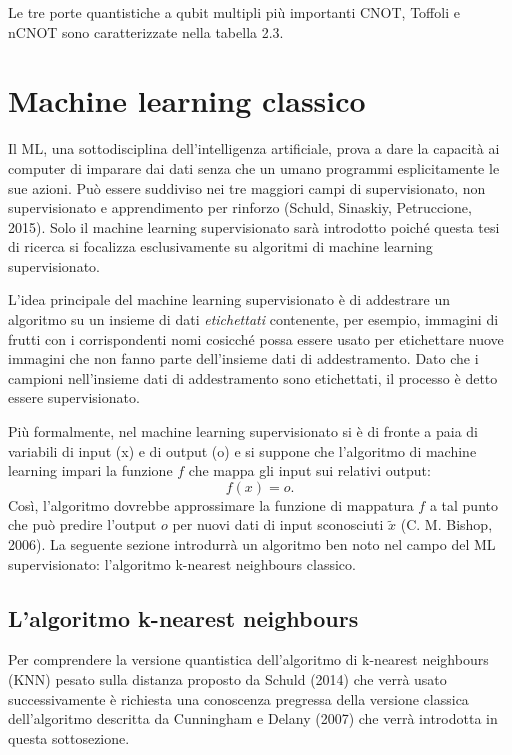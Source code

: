 Le tre porte quantistiche a qubit multipli più importanti CNOT, Toffoli e nCNOT 
sono caratterizzate nella tabella 2.3. 


\section{Machine learning classico}

Il \acf{ML}, una sottodisciplina dell'intelligenza artificiale, prova a dare la 
capacità ai computer di imparare dai dati senza che un umano programmi 
esplicitamente le sue azioni. Può essere suddiviso nei tre maggiori campi di 
supervisionato, non supervisionato e apprendimento per rinforzo (Schuld, 
Sinaskiy, Petruccione, 2015). Solo il machine learning supervisionato sarà 
introdotto poiché questa tesi di ricerca si focalizza esclusivamente su 
algoritmi di machine learning supervisionato. 

L'idea principale del machine learning supervisionato è di addestrare un 
algoritmo su un insieme di dati \emph{etichettati} contenente, per esempio, 
immagini di frutti con i corrispondenti nomi cosicché possa essere usato per 
etichettare nuove immagini che non fanno parte dell'insieme dati di addestramento. 
Dato che i campioni nell'insieme dati di addestramento sono etichettati, 
il processo è detto essere supervisionato. 

Più formalmente, nel machine learning supervisionato si è di fronte a paia di 
variabili di input (x) e di output (o) e si suppone che l'algoritmo di machine 
learning impari la funzione $f$ che mappa gli input sui relativi output: 
\begin{equation} \label{eq:2.38}
    f(x) = o.
\end{equation}
Così, l'algoritmo dovrebbe approssimare la funzione di mappatura $f$ a tal punto 
che può predire l'output $o$ per nuovi dati di input sconosciuti $\tilde{x}$ 
(C. M. Bishop, 2006). La seguente sezione introdurrà un algoritmo ben noto nel 
campo del \ac{ML} supervisionato: l'algoritmo k-nearest neighbours classico. 

\subsection{L'algoritmo k-nearest neighbours}

Per comprendere la versione quantistica dell'algoritmo di k-nearest neighbours 
(KNN) pesato sulla distanza proposto da Schuld (2014) che verrà usato 
successivamente è richiesta una conoscenza pregressa della versione classica 
dell'algoritmo descritta da Cunningham e Delany (2007) che verrà 
introdotta in questa sottosezione. 


